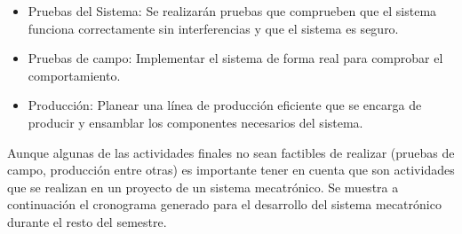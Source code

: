 \begin{itemize}
	\item Pruebas del Sistema: Se realizar\'an pruebas que comprueben que el sistema funciona correctamente sin interferencias y que el sistema es seguro.
	\item Pruebas de campo: Implementar el sistema de forma real para comprobar el comportamiento.
	\item Producci\'on: Planear una l\'inea de producci\'on eficiente que se encarga de producir y ensamblar los componentes necesarios del sistema.
\end{itemize}

Aunque algunas de las actividades finales no sean factibles de realizar (pruebas de campo, producci\'on entre otras) es importante tener en cuenta que son actividades que se realizan en un proyecto de un sistema mecatr\'onico.
\newline
Se muestra a continuaci\'on el cronograma generado para el desarrollo del sistema mecatr\'onico durante el resto del semestre.
\newline\newline\newline\newline

